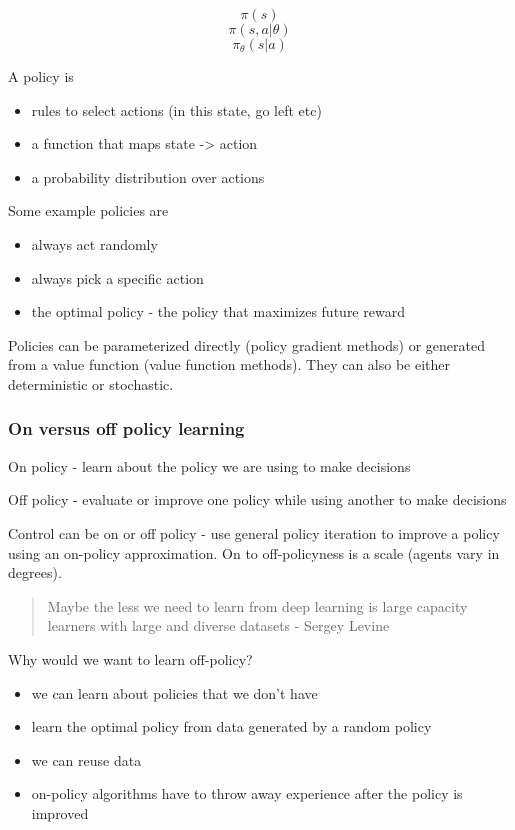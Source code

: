 \documentclass[]{article}
\providecommand{\tightlist}{%
  \setlength{\itemsep}{0pt}\setlength{\parskip}{0pt}}
\begin{document}
\[\pi(s)\] \[\pi(s,a|\theta)\] \[\pi_\theta(s|a)\]

A policy is

\begin{itemize}
\tightlist
\item
  rules to select actions (in this state, go left etc)
\item
  a function that maps state -\textgreater{} action
\item
  a probability distribution over actions
\end{itemize}

Some example policies are

\begin{itemize}
\tightlist
\item
  always act randomly
\item
  always pick a specific action
\item
  the optimal policy - the policy that maximizes future reward
\end{itemize}

Policies can be parameterized directly (policy gradient methods) or
generated from a value function (value function methods). They can also
be either deterministic or stochastic.

\hypertarget{on-versus-off-policy-learning}{%
\subsubsection{On versus off policy
learning}\label{on-versus-off-policy-learning}}

On policy - learn about the policy we are using to make decisions

Off policy - evaluate or improve one policy while using another to make
decisions

Control can be on or off policy - use general policy iteration to
improve a policy using an on-policy approximation. On to off-policyness
is a scale (agents vary in degrees).

\begin{quote}
Maybe the less we need to learn from deep learning is large capacity
learners with large and diverse datasets - Sergey Levine
\end{quote}

Why would we want to learn off-policy?

\begin{itemize}
\tightlist
\item
  we can learn about policies that we don't have
\item
  learn the optimal policy from data generated by a random policy
\item
  we can reuse data
\item
  on-policy algorithms have to throw away experience after the policy is
  improved
\end{itemize}
\end{document}
